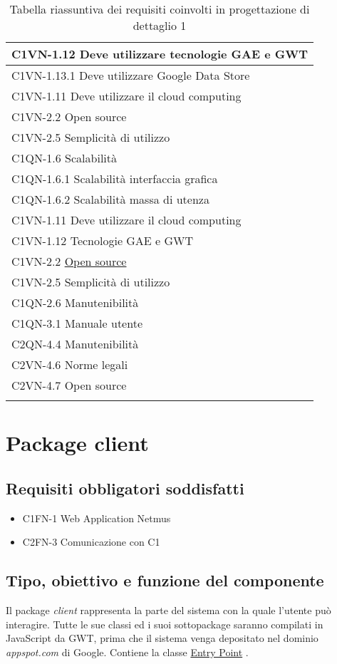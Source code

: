 \begin{footnotesize}
\begin{longtable}[!h]{|l|}
C1VN-1.12 Deve utilizzare tecnologie GAE e GWT \\ \hline 
C1VN-1.13.1 Deve utilizzare Google Data Store \\ \hline
C1VN-1.11 Deve utilizzare il cloud computing \\ \hline
C1VN-2.2 Open source \\ \hline
C1VN-2.5 Semplicit\`a di utilizzo \\ \hline
C1QN-1.6 Scalabilit\`a \\ \hline
C1QN-1.6.1 Scalabilit\`a interfaccia grafica \\ \hline
C1QN-1.6.2 Scalabilit\`a massa di utenza \\ \hline
C1VN-1.11 Deve utilizzare il cloud computing \\ \hline
C1VN-1.12 Tecnologie GAE e GWT \\ \hline
C1VN-2.2 \underline{Open source} \\ \hline
C1VN-2.5 Semplicit\`a di utilizzo \\ \hline
C1QN-2.6 Manutenibilit\`a \\ \hline
C1QN-3.1 Manuale utente \\ \hline
C2QN-4.4 Manutenibilit\`a \\ \hline
C2VN-4.6 Norme legali \\ \hline
C2VN-4.7 Open source \\ \hline
\caption{Tabella riassuntiva dei requisiti coinvolti in progettazione di
dettaglio 1}
\end{longtable}
\end{footnotesize}

\newpage
\section{Package client}
\subsection*{Requisiti obbligatori soddisfatti}
\begin{itemize}
	\item C1FN-1 Web Application Netmus
	\item C2FN-3 Comunicazione con C1
\end{itemize}
\subsection*{Tipo, obiettivo e funzione del componente} %
Il package \emph{client} rappresenta la parte del sistema con la quale l'utente
pu\`o interagire. Tutte le sue classi ed i suoi sottopackage saranno compilati in
JavaScript da GWT, prima che il sistema venga depositato nel dominio
\emph{appspot.com} di Google. Contiene la classe \underline{Entry Point}
.

